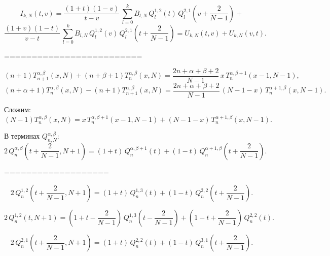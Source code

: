 \documentclass[12pt]{book}
\begin{document}
\newpage
\newpage



\begin{equation*}
  I_{k,N}(t,v) = \frac{(1+t)(1-v)}{t-v}\,
  \sum_{l=0}^{k} B_{l,N} \,
    Q^{1,2}_{l}(t)\,Q^{2,1}_{l}\left(v+\frac{2}{N-1}\right) +
\end{equation*}
\begin{equation*}
\frac{(1+v)(1-t)}{v-t}\,
\sum_{l=0}^{k} B_{l,N} \,
  Q^{1,2}_{l}(v)\,Q^{2,1}_{l}\left(t+\frac{2}{N-1}\right) =
U_{k,N}(t,v) + U_{k,N}(v,t).
\end{equation*}


=========================


\begin{equation*}
  (n+1) T^{\alpha,\beta}_{n+1}(x,N) + (n+\beta+1)T^{\alpha,\beta}_{n}(x,N) = \frac{2n+\alpha+\beta+2}{N-1}\,x\,T^{\alpha,\beta+1}_{n}(x-1,N-1),
\end{equation*}
\begin{equation*}
  (n+\alpha+1) T^{\alpha,\beta}_{n}(x,N) - (n+1)T^{\alpha,\beta}_{n+1}(x,N) = \frac{2n+\alpha+\beta+2}{N-1}\,(N-1-x)\,T^{\alpha+1,\beta}_{n}(x,N-1).
\end{equation*}

Сложим:
\begin{equation*}
  (N-1)T^{\alpha,\beta}_{n}(x,N) = x\,T^{\alpha,\beta+1}_{n}(x-1,N-1) + (N-1-x)\,T^{\alpha+1,\beta}_{n}(x,N-1).
\end{equation*}

В терминах $Q^{\alpha,\beta}_{n,N}$:
\begin{equation*}
  2\, Q^{\alpha,\beta}_{n}\left(t+\frac{2}{N-1},N+1\right) =
  (1+t)\,Q^{\alpha,\beta+1}_{n}(t) + (1-t)\,Q^{\alpha+1,\beta}_{n}\left(t+\frac{2}{N-1}\right).
\end{equation*}

===================


\begin{equation*}
  2\, Q^{1,2}_{n}\left(t+\frac{2}{N-1},N+1\right) =
  (1+t)\,Q^{1,3}_{n}(t) + (1-t)\,Q^{2,2}_{n}\left(t+\frac{2}{N-1}\right).
\end{equation*}

\begin{equation*}
  2\, Q^{1,2}_{n}\left(t,N+1\right) =
  \left(1+t-\frac{2}{N-1}\right)\,Q^{1,3}_{n}\left(t-\frac{2}{N-1}\right) + \left(1-t+\frac{2}{N-1}\right)\,Q^{2,2}_{n}\left(t\right).
\end{equation*}

\begin{equation*}
  2\, Q^{2,1}_{n}\left(t+\frac{2}{N-1},N+1\right) =
  (1+t)\,Q^{2,2}_{n}(t) + (1-t)\,Q^{3,1}_{n}\left(t+\frac{2}{N-1}\right).
\end{equation*}
\end{document}
